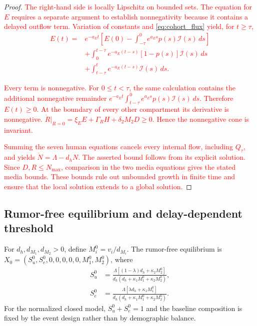 \documentclass[letterpaper,journal]{IEEEtran}
\begin{document}
	\begin{proof}
		\textcolor{red}{The right-hand side is locally Lipschitz on bounded sets. The equation for $E$ requires a separate argument to establish nonnegativity because it contains a delayed outflow term. Variation of constants and \eqref{eq:cohort_flux} yield, for $t\geq\tau$,}
		\textcolor{red}{
		\begin{align*}
		E(t)={}&e^{-a_Et}\!\left[E(0)-\int_{-\tau}^{0}e^{a_Es}p(s)\mathcal I(s)\,ds\right]\\
		&+\int_{0}^{t-\tau}e^{-a_E(t-s)}[1-p(s)]\mathcal I(s)\,ds\\
		&+\int_{t-\tau}^{t}e^{-a_E(t-s)}\mathcal I(s)\,ds.
		\end{align*}
		}

		\textcolor{red}{Every term is nonnegative. For $0\leq t<\tau$, the same calculation contains the additional nonnegative remainder
		$e^{-a_Et}\int_{t-\tau}^{0}e^{a_Es}p(s)\mathcal I(s)\,ds$.}
		\textcolor{red}{Therefore $E(t)\geq0$. At the boundary of every other compartment its derivative is nonnegative. $\dot R|_{R=0}=\xi_EE+\Gamma_RH+\delta_2M_2D\geq0$. Hence the nonnegative cone is invariant.}

		\textcolor{red}{Summing the seven human equations cancels every internal flow, including $Q_\tau$, and yields $\dot N=\Lambda-d_hN$. The asserted bound follows from its explicit solution. Since $D,R\leq N_{\max}$, comparison in the two media equations gives the stated media bounds. These bounds rule out unbounded growth in finite time and ensure that the local solution extends to a global solution.}
	\end{proof}

	\subsection{Rumor-free equilibrium and delay-dependent threshold}
	For $d_h,d_{M_1},d_{M_2}>0$, define $M_i^0=v_i/d_{M_i}$. The rumor-free equilibrium is
	$X_0=(S_u^0,S_e^0,0,0,0,0,0,M_1^0,M_2^0)$, where
	\begin{equation}
		\begin{aligned}
		S_u^0&=\frac{\Lambda[(1-\lambda)d_h+\kappa_2M_2^0]}
		{d_h(d_h+\kappa_1M_1^0+\kappa_2M_2^0)},\\
		S_e^0&=\frac{\Lambda[\lambda d_h+\kappa_1M_1^0]}
		{d_h(d_h+\kappa_1M_1^0+\kappa_2M_2^0)}.
		\end{aligned}
		\label{eq:dfe}
	\end{equation}
	For the normalized closed model, $S_u^0+S_e^0=1$ and the baseline composition is fixed by the event design rather than by demographic balance.
\end{document}
